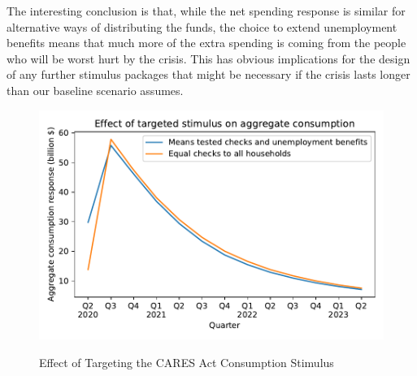 \documentclass[titlepage,a4paper]{\econtex}
\begin{document}
The interesting conclusion is that, while the net spending response is similar for alternative ways of distributing the funds, the choice to extend unemployment benefits means that much more of the extra spending is coming from the people who will be worst hurt by the crisis.  This has obvious implications for the design of any further stimulus packages that might be necessary if the crisis lasts longer than our baseline scenario assumes.

\begin{figure}
  \centering
  \caption{Effect of Targeting the CARES Act Consumption Stimulus}
  \label{EffectTargeting}
  { \includegraphics[width=8in]{./Figures/EffectTargeting}}
\end{figure}
\end{document}
